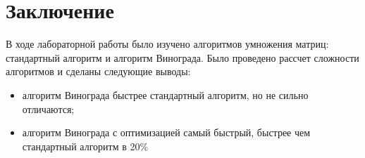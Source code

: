 \chapter*{Заключение}

В ходе лабораторной работы было изучено алгоритмов умножения матриц:
стандартный алгоритм и алгоритм Винограда. Было проведено рассчет сложности алгоритмов
и сделаны следующие выводы:

\begin{itemize}
    \item алгоритм Винограда быстрее стандартный алгоритм, но не сильно отличаются;
    \item алгоритм Винограда с оптимизацией самый быстрый,
    быстрее чем стандартный алгоритм в 20\%
\end{itemize}
